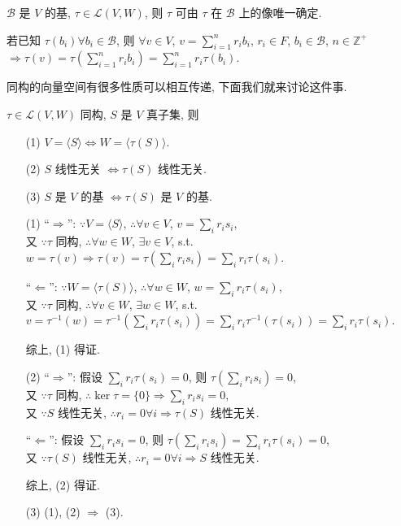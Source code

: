 \documentclass{note}
\begin{document}
\begin{thm}[(课本定理 2.2)]
    $\mathcal{B}$ 是 $V$ 的基, $\tau\in\mathcal{L}(V,W)$, 则 $\tau$ 可由 $\tau$ 在 $\mathcal{B}$ 上的像唯一确定.
\end{thm}
\begin{pf}
    若已知 $\tau(b_i)\forall b_i\in\mathcal{B}$, 则 $\forall v\in V$, $v=\sum_{i=1}^nr_ib_i$, $r_i\in F$, $b_i\in\mathcal{B}$, $n\in\mathbb{Z}^+$\\
    $\Longrightarrow\tau(v)=\tau\left(\sum_{i=1}^nr_ib_i\right)=\sum_{i=1}^nr_i\tau(b_i)$.
\end{pf}

同构的向量空间有很多性质可以相互传递, 下面我们就来讨论这件事.

\begin{thm}[(课本定理 2.4)]\label{thm-2.4}
    $\tau\in\mathcal{L}(V,W)$ 同构, $S$ 是 $V$ 真子集, 则
    \begin{itemize}
        \item[(1)] $V=\langle S\rangle\Longleftrightarrow W=\langle\tau(S)\rangle$.
        \item[(2)] $S$ 线性无关 $\Longleftrightarrow\tau(S)$ 线性无关.
        \item[(3)] $S$ 是 $V$ 的基 $\Longleftrightarrow\tau(S)$ 是 $V$ 的基.
    \end{itemize}
\end{thm}
\begin{pf}
    \begin{itemize}
        \item[(1)] ``$\Longrightarrow$'': $\because V=\langle S\rangle$, $\therefore\forall v\in V$, $v=\sum_ir_is_i$,\\
        又 $\because\tau$ 同构, $\therefore\forall w\in W$, $\exists v\in V$, s.t. $w=\tau(v)\Longrightarrow\tau(v)=\tau\left(\sum_ir_is_i\right)=\sum_ir_i\tau(s_i)$.

        ``$\Longleftarrow$'': $\because W=\langle\tau(S)\rangle$, $\therefore\forall w\in W$, $w=\sum_ir_i\tau(s_i)$,\\
        又 $\because\tau$ 同构, $\therefore\forall v\in W$, $\exists w\in W$, s.t. $v=\tau^{-1}(w)=\tau^{-1}\left(\sum_ir_i\tau(s_i)\right)=\sum_ir_i\tau^{-1}(\tau(s_i))=\sum_ir_i\tau(s_i)$.

        综上, (1) 得证.
        \item[(2)] ``$\Longrightarrow$'': 假设 $\sum_ir_i\tau(s_i)=0$, 则 $\tau\left(\sum_ir_is_i\right)=0$,\\
        又 $\because\tau$ 同构, $\therefore\ker\tau=\{0\}\Longrightarrow\sum_ir_is_i=0$,\\
        又 $\because S$ 线性无关, $\therefore r_i=0\forall i\Longrightarrow\tau(S)$ 线性无关.

        ``$\Longleftarrow$'': 假设 $\sum_ir_is_i=0$, 则 $\tau\left(\sum_ir_is_i\right)=\sum_ir_i\tau(s_i)=0$,\\
        又 $\because\tau(S)$ 线性无关, $\therefore r_i=0\forall i\Longrightarrow S$ 线性无关.

        综上, (2) 得证.
        \item[(3)] (1), (2) $\Longrightarrow$ (3).
    \end{itemize}
\end{pf}
\end{document}
